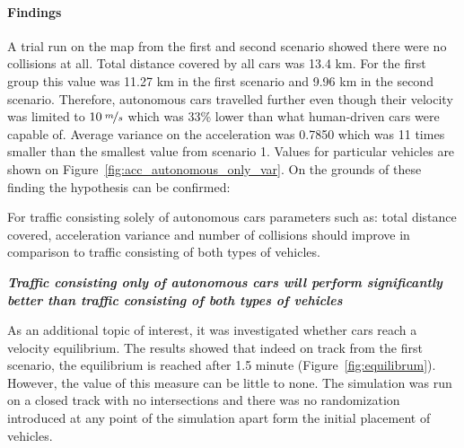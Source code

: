 \documentclass[11pt,english,twoside]{article}
\begin{document}
\paragraph{Findings}

A trial run on the map from the first and second scenario showed there were no collisions at all. Total distance covered by all cars was 13.4 km. For the first group this value was 11.27 km in the first scenario and 9.96 km in the second scenario. Therefore, autonomous cars travelled further even though their velocity was limited to $10\:\nicefrac{m}{s}$ which was 33\% lower than what human-driven cars were capable of. Average variance on the acceleration was 0.7850 which was 11 times smaller than the smallest value from scenario 1. Values for particular vehicles are shown on Figure~\ref{fig:acc_autonomous_only_var}. On the grounds of these finding the hypothesis can be confirmed:


For traffic consisting solely of autonomous cars parameters such as: total distance covered, acceleration variance and number of collisions should improve in comparison to traffic consisting of both types of vehicles.


\textit{\textbf{Traffic consisting only of autonomous cars will perform significantly better than traffic consisting of both types of vehicles}}


\par

As an additional topic of interest, it was investigated whether cars reach a velocity equilibrium. The results showed that indeed on track from the first scenario, the equilibrium is reached after 1.5 minute (Figure~\ref{fig:equilibrum}). However, the value of this measure can be little to none. The simulation was run on a closed track with no intersections and there was no randomization introduced at any point of the simulation apart form the initial placement of vehicles. 

\end{document}
